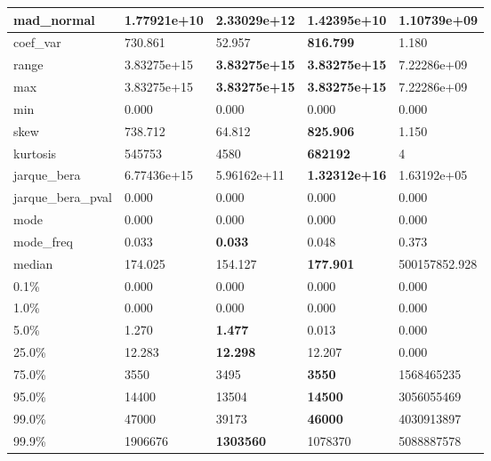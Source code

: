 \begin{table}[H]
\begin{tabular}{|l|m{10em}|m{10em}|m{10em}|m{10em}|}
\hline mad\_normal & 1.77921e+10 & \cellcolor[rgb]{0.9, 0.54, 0.52} 2.33029e+12 & \bfseries 1.42395e+10 & 1.10739e+09 \\
\hline coef\_var & 730.861 & 52.957 & \bfseries 816.799 & \cellcolor[rgb]{0.9, 0.54, 0.52} 1.180 \\
\hline range & 3.83275e+15 & \bfseries 3.83275e+15 & \bfseries 3.83275e+15 & \cellcolor[rgb]{0.9, 0.54, 0.52} 7.22286e+09 \\
\hline max & 3.83275e+15 & \bfseries 3.83275e+15 & \bfseries 3.83275e+15 & \cellcolor[rgb]{0.9, 0.54, 0.52} 7.22286e+09 \\
\hline min & 0.000 & 0.000 & 0.000 & 0.000 \\
\hline skew & 738.712 & 64.812 & \bfseries 825.906 & \cellcolor[rgb]{0.9, 0.54, 0.52} 1.150 \\
\hline kurtosis & 545753 & 4580 & \bfseries 682192 & \cellcolor[rgb]{0.9, 0.54, 0.52} 4 \\
\hline jarque\_bera & 6.77436e+15 & 5.96162e+11 & \bfseries 1.32312e+16 & \cellcolor[rgb]{0.9, 0.54, 0.52} 1.63192e+05 \\
\hline jarque\_bera\_pval & 0.000 & 0.000 & 0.000 & 0.000 \\
\hline mode & 0.000 & 0.000 & 0.000 & 0.000 \\
\hline mode\_freq & 0.033 & \bfseries 0.033 & 0.048 & \cellcolor[rgb]{0.9, 0.54, 0.52} 0.373 \\
\hline median & 174.025 & 154.127 & \bfseries 177.901 & \cellcolor[rgb]{0.9, 0.54, 0.52} 500157852.928 \\
\hline 0.1\% & 0.000 & 0.000 & 0.000 & 0.000 \\
\hline 1.0\% & 0.000 & 0.000 & 0.000 & 0.000 \\
\hline 5.0\% & 1.270 & \bfseries 1.477 & 0.013 & \cellcolor[rgb]{0.9, 0.54, 0.52} 0.000 \\
\hline 25.0\% & 12.283 & \bfseries 12.298 & 12.207 & \cellcolor[rgb]{0.9, 0.54, 0.52} 0.000 \\
\hline 75.0\% & 3550 & 3495 & \bfseries 3550 & \cellcolor[rgb]{0.9, 0.54, 0.52} 1568465235 \\
\hline 95.0\% & 14400 & 13504 & \bfseries 14500 & \cellcolor[rgb]{0.9, 0.54, 0.52} 3056055469 \\
\hline 99.0\% & 47000 & 39173 & \bfseries 46000 & \cellcolor[rgb]{0.9, 0.54, 0.52} 4030913897 \\
\hline 99.9\% & 1906676 & \bfseries 1303560 & 1078370 & \cellcolor[rgb]{0.9, 0.54, 0.52} 5088887578 \\
\hline
\end{tabular}
\end{table}

